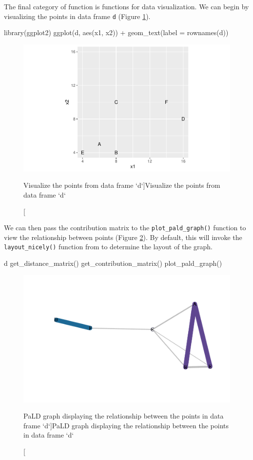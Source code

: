The final category of function is functions for data visualization. We
can begin by visualizing the points in data frame \texttt{d} (Figure
\ref{fig:fig1}).

\begin{Schunk}
\begin{Sinput}
library(ggplot2)
ggplot(d, aes(x1, x2)) +
  geom_text(label = rownames(d))
\end{Sinput}
\begin{figure}
\includegraphics{manuscript_files/figure-latex/fig1-1} \caption[Visualize the points from data frame `d`]{Visualize the points from data frame `d`}\label{fig:fig1}
\end{figure}
\end{Schunk}

We can then pass the contribution matrix to the
\texttt{plot\_pald\_graph()} function to view the relationship between
points (Figure \ref{fig:fig2}). By default, this will invoke the
\texttt{layout\_nicely()} function from  to determine
the layout of the graph.

\begin{Schunk}
\begin{Sinput}
d %
  get_distance_matrix() %
  get_contribution_matrix() %
  plot_pald_graph()
\end{Sinput}
\begin{figure}
\includegraphics{manuscript_files/figure-latex/fig2-1} \caption[PaLD graph displaying the relationship between the points in data frame `d`]{PaLD graph displaying the relationship between the points in data frame `d`}\label{fig:fig2}
\end{figure}
\end{Schunk}

